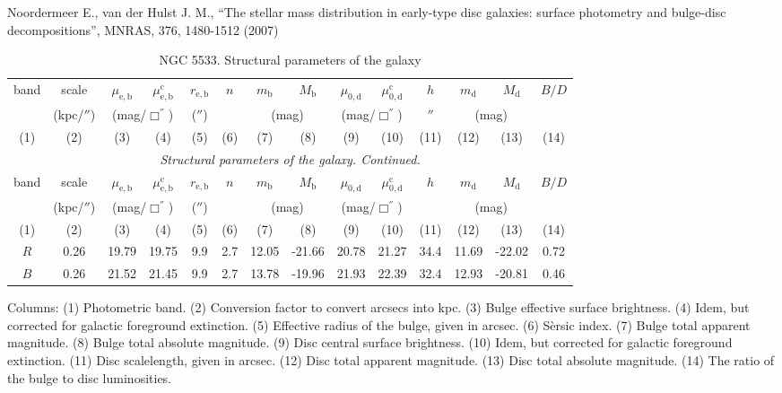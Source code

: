 \documentclass[english,10pt]{article}
\def\mm{\mathrm}
\begin{document}
\noindent
Noordermeer E., van der Hulst J. M., 
``The stellar mass distribution in early-type disc galaxies: surface
photometry and bulge-disc decompositions'', 
MNRAS, 376, 1480-1512 (2007)

\begin{longtable}[c]{cccccccccccccc}
\caption{NGC 5533. Structural parameters of the galaxy} \\ 
\hline 
band & scale & 
$\mu_\mm{e,b}$ & $\mu_\mm{e,b}^\mm{c}$ & $r_\mm{e,b}$ & 
$n$ & $m_\mm{b}$ & $M_\mm{b}$ & 
$\mu_\mm{0,d}$ & $\mu_\mm{0,d}^\mm{c}$ & $h$ & 
$m_\mm{d}$ & $M_\mm{d}$ & $B/D$ \\ 
& (kpc/$''$) & \multicolumn{2}{c}{(mag/$\Box^{''}$)} & ($''$) 
& & \multicolumn{2}{c}{(mag)} & 
\multicolumn{2}{c}{(mag/$\Box^{''}$)} & $''$ & 
\multicolumn{2}{c}{(mag)} & \\
(1)&(2)&(3)&(4)&(5)&(6)&(7)&(8)&(9)&(10)&(11)&(12)&(13)&(14) \\ 
\hline
\endfirsthead 
\hline
\multicolumn{14}{c}{\small\slshape Structural parameters of the galaxy. 
Continued. } \\ \hline
band & scale & 
$\mu_\mm{e,b}$ & $\mu_\mm{e,b}^\mm{c}$ & $r_\mm{e,b}$ & 
$n$ & $m_\mm{b}$ & $M_\mm{b}$ & 
$\mu_\mm{0,d}$ & $\mu_\mm{0,d}^\mm{c}$ & $h$ & 
$m_\mm{d}$ & $M_\mm{d}$ & $B/D$ \\ 
& (kpc/$''$) & \multicolumn{2}{c}{(mag/$\Box^{''}$)} & ($''$) 
& & \multicolumn{2}{c}{(mag)} & 
\multicolumn{2}{c}{(mag/$\Box^{''}$)} & & 
\multicolumn{2}{c}{(mag)} & \\
(1)&(2)&(3)&(4)&(5)&(6)&(7)&(8)&(9)&(10)&(11)&(12)&(13)&(14) \\
\hline
\endhead 
\hline
$R$ & 0.26 & 19.79 & 19.75 & 9.9 & 2.7 & 12.05 & -21.66 & 
20.78 & 21.27 & 34.4 & 11.69 & -22.02 & 0.72 \tabularnewline

$B$ & 0.26 & 21.52 & 21.45 & 9.9 & 2.7 & 13.78 & -19.96 & 
21.93 & 22.39 & 32.4 & 12.93 & -20.81 & 0.46 \tabularnewline
\hline
\end{longtable}

Columns: 
(1) Photometric band. 
(2) Conversion factor to convert arcsecs into kpc.
(3) Bulge effective surface brightness. 
(4) Idem, but corrected for galactic foreground extinction.
(5) Effective radius of the bulge, given in arcsec.
(6) S\`ersic index. 
(7) Bulge total apparent magnitude.
(8) Bulge total absolute magnitude.
(9) Disc central surface brightness. 
(10) Idem, but corrected for galactic foreground extinction.
(11) Disc scalelength, given in arcsec.
(12) Disc total apparent magnitude.
(13) Disc total absolute magnitude. 
(14) The ratio of the bulge to disc luminosities. 
\end{document}

